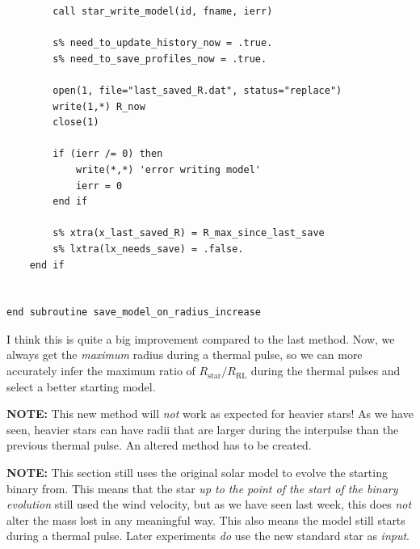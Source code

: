 \documentclass[a4paper,10pt]{article}
\begin{document}
\begin{verbatim}
        call star_write_model(id, fname, ierr)

        s% need_to_update_history_now = .true.
        s% need_to_save_profiles_now = .true.

        open(1, file="last_saved_R.dat", status="replace")
        write(1,*) R_now
        close(1)

        if (ierr /= 0) then
            write(*,*) 'error writing model'
            ierr = 0
        end if

        s% xtra(x_last_saved_R) = R_max_since_last_save
        s% lxtra(lx_needs_save) = .false.
    end if


end subroutine save_model_on_radius_increase
\end{verbatim}
I think this is quite a big improvement compared to the last method. Now, we always get the \emph{maximum} radius during a thermal pulse, so we can more accurately infer the maximum ratio of \(R_\text{star} / R_\text{RL}\) during the thermal pulses and select a better starting model.

\begin{questionbox}{}{}
    \textbf{\textcolor{keywordscolor}{NOTE:}} This new method will \emph{not} work as expected for heavier stars! As we have seen, heavier stars can have radii that are larger during the interpulse than the previous thermal pulse. An altered method has to be created.
\end{questionbox}


\begin{questionbox}{}{}
    \textbf{\textcolor{keywordscolor}{NOTE:}} This section still uses the original solar model to evolve the starting binary from. This means that the star \emph{up to the point of the start of the binary evolution} still used the \citet{vassiliadis1993} wind velocity, but as we have seen last week, this does \emph{not} alter the mass lost in any meaningful way. This also means the model still starts during a thermal pulse. Later experiments \emph{do} use the new standard star as \emph{input}.
\end{questionbox}
\end{document}
